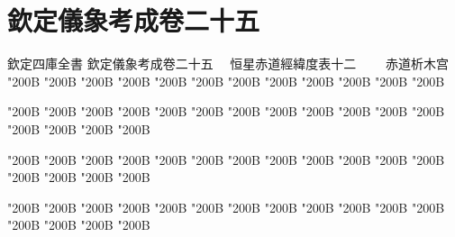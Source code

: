 \chapter*{欽定儀象考成卷二十五}
\begin{正文}
欽定四庫全書
欽定儀象考成卷二十五
　恒星赤道經緯度表十二
　　赤道析木宫
\char"200B\relax{}
\char"200B\relax{}
\char"200B\relax{}
\char"200B\relax{}
\char"200B\relax{}
\char"200B\relax{}
\char"200B\relax{}
\char"200B\relax{}
\char"200B\relax{}
\char"200B\relax{}
\char"200B\relax{}
\char"200B\relax
\par
\end{正文}\clearpage
{}
\begin{正文}
\char"200B\relax{}
\char"200B\relax{}
\char"200B\relax{}
\char"200B\relax{}
\char"200B\relax{}
\char"200B\relax{}
\char"200B\relax{}
\char"200B\relax{}
\char"200B\relax{}
\char"200B\relax{}
\char"200B\relax{}
\char"200B\relax{}
\char"200B\relax{}
\char"200B\relax{}
\char"200B\relax{}
\char"200B\relax
{}\par
\end{正文}\clearpage
{}
\begin{正文}
\char"200B\relax{}
\char"200B\relax{}
\char"200B\relax{}
\char"200B\relax{}
\char"200B\relax{}
\char"200B\relax{}
\char"200B\relax{}
\char"200B\relax{}
\char"200B\relax{}
\char"200B\relax{}
\char"200B\relax{}
\char"200B\relax{}
\char"200B\relax{}
\char"200B\relax{}
\char"200B\relax{}
\char"200B\relax
{}\par
\end{正文}\clearpage
{}
\begin{正文}
\char"200B\relax{}
\char"200B\relax{}
\char"200B\relax{}
\char"200B\relax{}
\char"200B\relax{}
\char"200B\relax{}
\char"200B\relax{}
\char"200B\relax{}
\char"200B\relax{}
\char"200B\relax{}
\char"200B\relax{}
\char"200B\relax{}
\char"200B\relax{}
\char"200B\relax{}
\char"200B\relax{}
\char"200B\relax
{}\par
\end{正文}\clearpage
